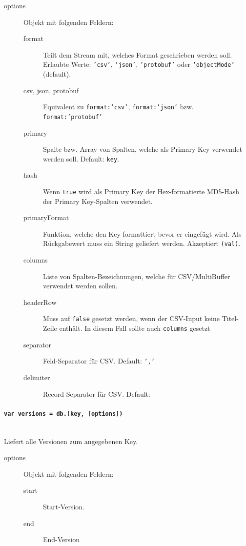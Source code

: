 \begin{description}
\item[options] Objekt mit folgenden Feldern:
    \begin{description}
    \item[format] Teilt dem Stream mit, welches Format geschrieben werden soll. Erlaubte Werte: \texttt{'csv'}, \texttt{'json'}, \texttt{'protobuf'} oder \texttt{'objectMode'} (default).
    \item[csv, json, protobuf] Equivalent zu \texttt{format:'csv'}, \texttt{format:'json'} bzw. \texttt{format:'protobuf'}
    \item[primary] Spalte bzw. Array von Spalten, welche als Primary Key verwendet werden soll. Default: \texttt{key}.
    \item[hash] Wenn \texttt{true} wird als Primary Key der Hex-formatierte MD5-Hash der Primary Key-Spalten verwendet.
    \item[primaryFormat] Funktion, welche den Key formattiert bevor er eingefügt wird. Als Rückgabewert muss ein String geliefert werden. Akzeptiert \texttt{(val)}.
    \item[columns] Liste von Spalten-Bezeichnungen, welche für CSV/MultiBuffer verwendet werden sollen.
    \item[headerRow] Muss auf \texttt{false} gesetzt werden, wenn der CSV-Input keine Titel-Zeile enthält. In diesem Fall sollte auch \texttt{columns} gesetzt
    \item[separator] Feld-Separator für CSV. Default: \texttt{','}
    \item[delimiter] Record-Separator für CSV. Default: 
    \end{description}
\end{description}


\paragraph{\texttt{var versions = db.(key, [options])}} ~\\
Liefert alle Versionen zum angegebenen Key.
\begin{description}
\item[options] Objekt mit folgenden Feldern:
    \begin{description}
    \item[start] Start-Version.
    \item[end] End-Version
    \end{description}
\end{description}

